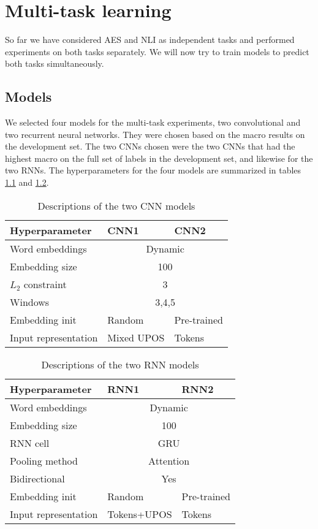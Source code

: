 \chapter{Multi-task learning}

So far we have considered \ac{AES} and \ac{NLI} as independent tasks and
performed experiments on both tasks separately. We will now try to train
models to predict both tasks simultaneously.


\section{Models}

We selected four models for the multi-task experiments, two convolutional and
two recurrent neural networks. They were chosen based on the macro \FI results
on the development set. The two \acp{CNN} chosen were the two \acp{CNN} that
had the highest macro \FI on the full set of labels in the development set,
and likewise for the two \acp{RNN}. The hyperparameters for the four models are
summarized in tables \ref{tab:cnn-parameters} and \ref{tab:rnn-parameters}.

\begin{table}
  \centering
  \begin{tabular}{lll}
    \toprule
    Hyperparameter & CNN1 & CNN2 \\
    \midrule
    Word embeddings & \multicolumn{2}{c}{Dynamic} \\
    Embedding size & \multicolumn{2}{c}{100} \\
    $L_2$ constraint & \multicolumn{2}{c}{3} \\
    Windows & \multicolumn{2}{c}{3,4,5} \\
    Embedding init & Random & Pre-trained \\
    Input representation & Mixed UPOS & Tokens \\
    \bottomrule
  \end{tabular}
  \caption{Descriptions of the two CNN models}
  \label{tab:cnn-parameters}
\end{table}

\begin{table}
  \centering
  \begin{tabular}{lll}
    \toprule
    Hyperparameter & RNN1 & RNN2 \\
    \midrule
    Word embeddings & \multicolumn{2}{c}{Dynamic} \\
    Embedding size & \multicolumn{2}{c}{100} \\
    RNN cell & \multicolumn{2}{c}{GRU} \\
    Pooling method & \multicolumn{2}{c}{Attention} \\
    Bidirectional & \multicolumn{2}{c}{Yes} \\
    Embedding init & Random & Pre-trained \\
    Input representation & Tokens+UPOS & Tokens \\
    \bottomrule
  \end{tabular}
  \caption{Descriptions of the two RNN models}
  \label{tab:rnn-parameters}
\end{table}

